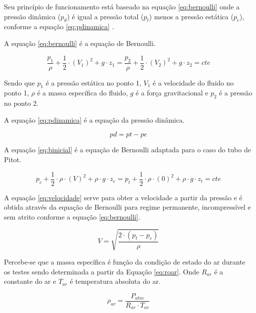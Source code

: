 Seu princípio de funcionamento está baseado na equação \ref{eq:bernoulli} onde 
a pressão dinâmica ($p_{d}$) é igual a pressão total ($p_{t}$) menos a pressão estática ($p_{e}$), 
conforme a equação \ref{eq:pdinamica} \cite{pritchard2005fox}.

A equação \ref{eq:bernoulli} é a equação de Bernoulli.

\begin{equation}\label{eq:bernoulli}
    \frac{p_{1}}{\rho} + \frac{1}{2} \cdot (V_{1})^{2} + g \cdot z_{1} = \frac{p_{2}}{\rho} + \frac{1}{2} \cdot (V_{2})^{2} + g \cdot z_{2} = cte  
\end{equation}

Sendo que $p_{1}$ é a pressão estática no ponto 1, $V_{1}$ é a velocidade do fluido no ponto 1, $\rho$ 
é a massa específica do fluido, $g$ é a força gravitacional e $p_{2}$ é a pressão no ponto 2.

A equação \ref{eq:pdinamica} é a equação da pressão dinâmica.

\begin{equation}\label{eq:pdinamica}
    pd = pt - pe
\end{equation}

A equação \ref{eq:binicial} é a equação de Bernoulli adaptada para o caso do tubo de Pitot.

\begin{equation}\label{eq:binicial}
    p_{e} + \frac{1}{2} \cdot \rho \cdot (V)^{2} + \rho \cdot g \cdot z_{e} = p_{t} + \frac{1}{2} \cdot \rho \cdot (0)^{2} + \rho \cdot g \cdot z_{t} = cte  
\end{equation}

A equação \ref{eq:velocidade} serve para obter a velocidade a partir da pressão e é obtida 
através da equação de Bernoulli para regime permanente, incompressível e sem atrito 
conforme a equação \ref{eq:bernoulli}.

\begin{equation}\label{eq:velocidade}
    V = \sqrt{\frac{2 \cdot (p_{t} - p_{e})}{\rho}}
\end{equation}

Percebe-se que a massa específica é função da condição 
de estado do ar durante os testes sendo determinada a partir da Equação \ref{eq:roar}. 
Onde $R_{ar}$ é a constante do ar e $T_{ar}$ é temperatura absoluta do ar.

\begin{equation}\label{eq:roar}
    \rho_{ar} = \frac{P_{atm}}{R_{ar} \cdot T_{ar}}
\end{equation}


